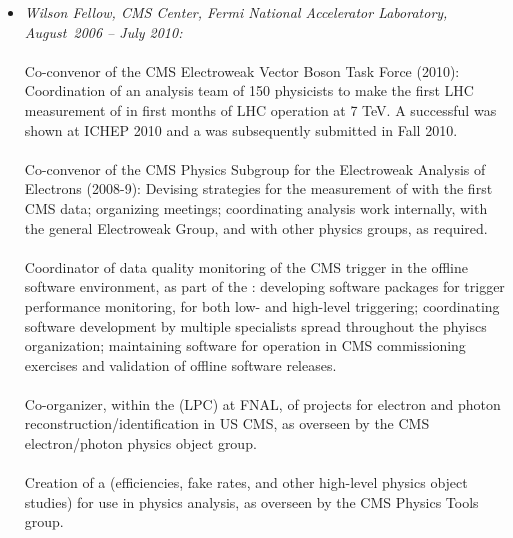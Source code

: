 \documentclass [12pt]{report}
\begin{document}
\begin{itemize}
\item{{\em Wilson Fellow, CMS Center, Fermi National Accelerator Laboratory,\\
 August~2006 -- July 2010:} \\ \\
Co-convenor of the CMS Electroweak Vector Boson Task Force (2010): Coordination of an analysis team of 150 physicists to make the first LHC measurement of  in first months of LHC operation at 7 TeV.  A successful  was shown at ICHEP 2010 and a  was subsequently submitted in Fall 2010.  
 \\ \\
Co-convenor of the CMS Physics Subgroup for the Electroweak Analysis of Electrons (2008-9):  Devising strategies for the measurement of  with the first CMS data; organizing meetings; coordinating analysis work internally, with the general Electroweak Group, and with other physics groups, as required.
\\ \\
Coordinator of data quality monitoring of the CMS trigger in the offline software environment, as part of the : developing software packages for trigger performance monitoring, for both low- and high-level triggering; coordinating software development by multiple specialists spread throughout the phyiscs organization; maintaining software for operation in CMS commissioning exercises and validation of offline software releases.  
\\ \\
Co-organizer, within the  (LPC) at FNAL, of projects 
for electron and photon reconstruction/identification in US CMS, as overseen by the CMS electron/photon physics object group.
\\ \\
Creation of a  (efficiencies, fake rates, and other high-level physics object studies) for use in physics analysis, as overseen by the CMS Physics Tools group. 
}
\end{itemize}
\end{document}
